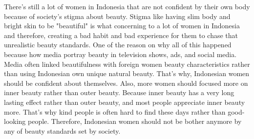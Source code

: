 \documentclass[12pt]{article}
\begin{document}
\begin{refsection}
    There's still a lot of women in Indonesia that are not confident by their
    own body because of society's stigma about beauty. Stigma like having slim
    body and bright skin to be "beautiful" is what concerning to a lot of women 
    in Indonesia and therefore, creating a bad habit and bad experience for them
    to chase that unrealistic beauty standards. One of the reason on why all of
    this happened because how media portray beauty in television shows, ads, and
    social media. Media often linked beautifulness with foreign women beauty
    characteristics rather than using Indonesian own unique natural beauty.
    That's why, Indonesian women should be confident about themselves.
    Also, more women should focused more on inner beauty rather than outer
    beauty. Because inner beauty has a very long lasting effect rather than outer
    beauty, and most people appreciate inner beauty more. That's why kind people 
    is often hard to find these days rather than good-looking people. 
    Therefore, Indonesian women should not be bother anymore by any of beauty
    standards set by society.
    
    \pagebreak
    \nocite{
        fardoulyNegativeComparisonsOne2015,
        fimela.comIniAlasanMengapa2018,
        InnerBeautyLebih,
        islameyWacanaStandarKecantikan2020,
        kumparanwomanBagaimanaCaraMeningkatkan2019,
        maleSurvei84Persen,
        mediaTakHarusKulit2021,
        oakesComplicatedTruthSocial,
        obioraDarkSideSocial0100,
        prianti2013indonesian,
        puspitasariDiscourseShiftingLocal2020,
        rachmanBalancingOuterInner2013,
        ratnaningtiasCantikDiInstagram2018,
        rizkiyahSTRATEGICOPINGPEREMPUAN2020,
        schmalzriedInnerBeautyFriendshipHypothesis2013,
        wirasariKAJIANKECANTIKANKAUM2016,
        wisnubrataCaraMemancarkanInner2020}
        \printbibliography[title=Essay References]
    \end{refsection}

    
\end{document}
